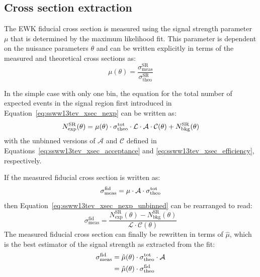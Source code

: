 \subsection{Cross section extraction}\label{ssww13tev:xsec_method}
The \ssww EWK fiducial cross section is measured using the signal strength parameter $\mu$ that is determined by the maximum likelihood fit.
This parameter is dependent on the nuisance parameters $\theta$ and can be written explicitly in terms of the measured and theoretical cross sections as:
\begin{equation}
  \mu(\theta) = \frac{\sigma_{\textrm{meas}}^{\textrm{SR}}}{\sigma_{\textrm{theo}}^{\textrm{SR}}}
  \label{eq:ssww13tev_xsec_mu}
\end{equation}

In the simple case with only one bin, the equation for the total number of expected events in the signal region first introduced in Equation~\ref{eq:ssww13tev_xsec_nexp} can be written as:
\begin{equation}
  N_{\textrm{exp}}^{\textrm{SR}}(\theta) = \mu(\theta)\cdot\sigmatottheo\cdot\mathcal{L}\cdot\mathcal{A}\cdot\mathcal{C}(\theta)+N_{\textrm{bkg}}^{\textrm{SR}}(\theta)
  \label{eq:ssww13tev_xsec_nexp_unbinned}
\end{equation}
with the unbinned versions of $\mathcal{A}$ and $\mathcal{C}$ defined in Equations~\ref{eq:ssww13tev_xsec_acceptance} and \ref{eq:ssww13tev_xsec_efficiency}, respectively.

If the measured fiducial cross section is written as:
\begin{equation}
  \sigma_{\textrm{meas}}^{\textrm{fid}} = \mu\cdot\mathcal{A}\cdot\sigma_{\textrm{theo}}^{\textrm{tot}}
\end{equation}
then Equation~\ref{eq:ssww13tev_xsec_nexp_unbinned} can be rearranged to read:
\begin{equation}
  \sigma_{\textrm{meas}}^{\textrm{fid}} = \frac{N_{\textrm{exp}}^{\textrm{SR}}(\theta)-N_{\textrm{bkg}}^{\textrm{SR}}(\theta)}{\mathcal{L}\cdot\mathcal{C}(\theta)}
  \label{eq:ssww13tev_xsec_fid_meas}
\end{equation}
The measured fiducial cross section can finally be rewritten in terms of $\hat{\mu}$, which is the best estimator of the signal strength as extracted from the fit:
\begin{equation}
  \begin{aligned}
    \sigma_{\textrm{meas}}^{\textrm{fid}} &= \hat{\mu}(\theta)\cdot\sigmatottheo\cdot\mathcal{A}\\
    &= \hat{\mu}(\theta)\cdot\sigma_{\textrm{theo}}^{\textrm{fid}}
  \end{aligned}
  \label{eq:ssww13tev_xsec_fid_meas_mu}
\end{equation}

